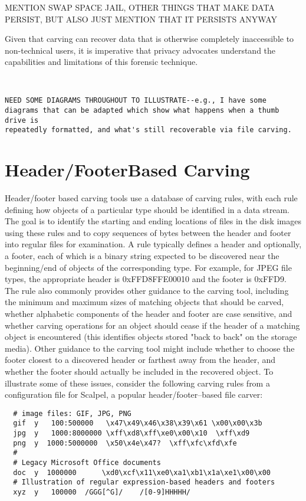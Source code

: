 MENTION SWAP SPACE JAIL, OTHER THINGS THAT MAKE DATA PERSIST, BUT ALSO JUST MENTION THAT IT PERSISTS ANYWAY   

Given that carving can recover data that is otherwise completely inaccessible to non-technical users, it is imperative that privacy advocates understand the capabilities and limitations of this forensic technique.  

\begin{Verbatim}


NEED SOME DIAGRAMS THROUGHOUT TO ILLUSTRATE--e.g., I have some 
diagrams that can be adapted which show what happens when a thumb drive is
repeatedly formatted, and what's still recoverable via file carving.
\end{Verbatim}

\section{Header/Footer\-Based Carving}

Header/footer based carving tools use a database of carving rules, with each rule defining how objects of a particular type should be identified in a data stream.  The goal is to identify the starting and ending locations of files in the disk images using these rules and to copy sequences of bytes between the header and footer into regular files for examination.  A rule typically defines a header and optionally, a footer, each of which is a binary string expected to be discovered near the beginning/end of objects of the corresponding type.  For example, for JPEG file types, the appropriate header is 0xFFD8FFE00010 and the footer is 0xFFD9.  The rule also commonly provides other guidance to the carving tool, including the minimum and maximum sizes of matching objects that should be carved, whether alphabetic components of the header and footer are case sensitive, and whether carving operations for an object should cease if the header of a matching object is encountered (this identifies objects stored "back to back" on the storage media).  Other guidance to the carving tool might include whether to choose the footer closest to a discovered header or farthest away from the header, and whether the footer should actually be included in the recovered object.  To illustrate some of these issues, consider the following carving rules from a configuration file for Scalpel, a popular header/footer--based file carver:

{
\medium
\begin{Verbatim}
  # image files: GIF, JPG, PNG
  gif  y   100:500000   \x47\x49\x46\x38\x39\x61 \x00\x00\x3b
  jpg  y   1000:8000000 \xff\xd8\xff\xe0\x00\x10  \xff\xd9
  png  y  1000:5000000  \x50\x4e\x47?  \xff\xfc\xfd\xfe
  #
  # Legacy Microsoft Office documents
  doc  y  1000000      \xd0\xcf\x11\xe0\xa1\xb1\x1a\xe1\x00\x00 
  # Illustration of regular expression-based headers and footers
  xyz  y   100000  /GGG[^G]/    /[0-9]HHHHH/
\end{Verbatim}
}

